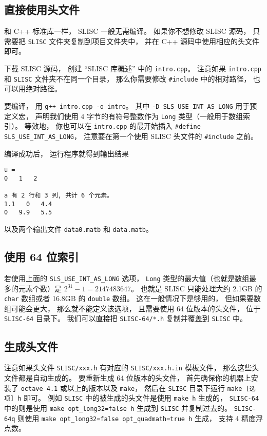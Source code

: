 
\begin{issues}
\issueDraft
\end{issues}


\subsection{直接使用头文件}
和 C++ 标准库一样， SLISC 一般无需编译。 如果你不想修改 SLISC 源码， 只需要把 \verb|SLISC| 文件夹复制到项目文件夹中， 并在 C++ 源码中使用相应的头文件即可。

下载 SLISC 源码， 创建 “SLISC 库概述” 中的 \verb|intro.cpp|。 注意如果 \verb|intro.cpp| 和 \verb|SLISC| 文件夹不在同一个目录， 那么你需要修改 \verb|#include| 中的相对路径， 也可以用绝对路径。

要编译， 用 \verb|g++ intro.cpp -o intro|。 其中 \verb|-D SLS_USE_INT_AS_LONG| 用于预定义宏， 声明我们使用 4 字节的有符号整数作为 \verb|Long| 类型（一般用于数组索引）。 等效地， 你也可以在 \verb|intro.cpp| 的最开始插入 \verb|#define SLS_USE_INT_AS_LONG|， 注意要在第一个使用 SLISC 头文件的 \verb|#include| 之前。

编译成功后， 运行程序就得到输出结果
\begin{lstlisting}[language=none]
u = 
0   1   2   

a 有 2 行和 3 列, 共计 6 个元素。
1.1   0   4.4   
0   9.9   5.5
\end{lstlisting}
以及两个输出文件 \verb|data0.matb| 和 \verb|data.matb|。

\subsection{使用 64 位索引}
若使用上面的 \verb|SLS_USE_INT_AS_LONG| 选项， \verb|Long| 类型的最大值（也就是数组最多的元素个数）是 $2^{31}-1 = 2147483647$。 也就是 SLISC 只能处理大约 2.1GB 的 \verb|char| 数组或者 16.8GB 的 \verb|double| 数组。 这在一般情况下是够用的， 但如果要数组可能会更大， 那么就不能定义该选项， 且需要使用 64 位版本的头文件， 位于 \verb|SLISC-64| 目录下。 我们可以直接把 \verb|SLISC-64/*.h| 复制并覆盖到 \verb|SLISC| 中。

\subsection{生成头文件}

注意如果头文件 \verb|SLISC/xxx.h| 有对应的 \verb|SLISC/xxx.h.in| 模板文件， 那么这些头文件都是自动生成的。 要重新生成 64 位版本的头文件， 首先确保你的机器上安装了 \verb|octave 4.1| 或以上的版本以及 \verb|make|， 然后在 \verb|SLISC| 目录下运行 \verb|make [选项] h| 即可。 例如 \verb|SLISC| 中的被生成的头文件是使用 \verb|make h| 生成的， \verb|SLISC-64| 中的则是使用 \verb|make opt_long32=false h| 生成到 \verb|SLISC| 并复制过去的。 \verb|SLISC-64q| 则使用 \verb|make opt_long32=false opt_quadmath=true h| 生成， 支持 4 精度浮点数。

